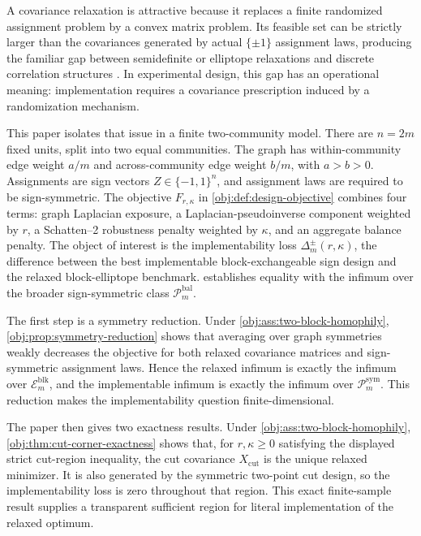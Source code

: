 \documentclass[11pt]{article}
\begin{document}
A covariance relaxation is attractive because it replaces a finite randomized assignment problem by a convex matrix problem. Its feasible set can be strictly larger than the covariances generated by actual \(\{\pm1\}\) assignment laws, producing the familiar gap between semidefinite or elliptope relaxations and discrete correlation structures \citep{goemans1995,deza1997}. In experimental design, this gap has an operational meaning: implementation requires a covariance prescription induced by a randomization mechanism.

This paper isolates that issue in a finite two-community model. There are \(n=2m\) fixed units, split into two equal communities. The graph has within-community edge weight \(a/m\) and across-community edge weight \(b/m\), with \(a>b>0\). Assignments are sign vectors \(Z\in\{-1,1\}^n\), and assignment laws are required to be sign-symmetric. The objective \(F_{r,\kappa}\) in \cref{obj:def:design-objective} combines four terms: graph Laplacian exposure, a Laplacian-pseudoinverse component weighted by \(r\), a Schatten--2 robustness penalty weighted by \(\kappa\), and an aggregate balance penalty. The object of interest is the implementability loss \(\Delta_m^{\pm}(r,\kappa)\), the difference between the best implementable block-exchangeable sign design and the relaxed block-elliptope benchmark.  establishes equality with the infimum over the broader sign-symmetric class \(\mathcal P_m^{\mathrm{bal}}\).

The first step is a symmetry reduction. Under \cref{obj:ass:two-block-homophily}, \cref{obj:prop:symmetry-reduction} shows that averaging over graph symmetries weakly decreases the objective for both relaxed covariance matrices and sign-symmetric assignment laws. Hence the relaxed infimum is exactly the infimum over \(\mathcal E_m^{\mathrm{blk}}\), and the implementable infimum is exactly the infimum over \(\mathcal P_m^{\mathrm{sym}}\). This reduction makes the implementability question finite-dimensional.

The paper then gives two exactness results. Under \cref{obj:ass:two-block-homophily}, \cref{obj:thm:cut-corner-exactness} shows that, for \(r,\kappa\ge0\) satisfying the displayed strict cut-region inequality, the cut covariance \(X_{\mathrm{cut}}\) is the unique relaxed minimizer. It is also generated by the symmetric two-point cut design, so the implementability loss is zero throughout that region. This exact finite-sample result supplies a transparent sufficient region for literal implementation of the relaxed optimum.
\end{document}
